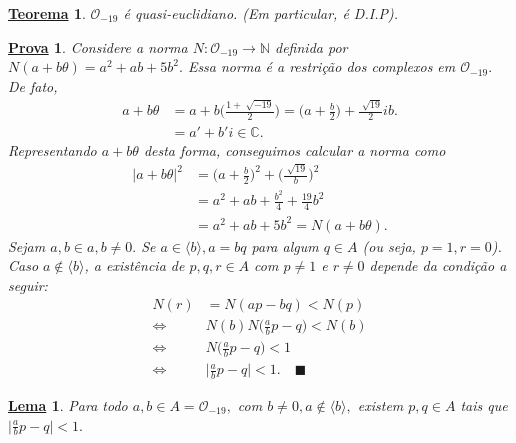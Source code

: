 \documentclass{article}
\newtheorem*{theorem*}{\underline{Teorema}}
\newtheorem*{lemma*}{\underline{Lema}}
\newtheorem*{proof*}{\underline{Prova}}
\renewcommand\qedsymbol{$\blacksquare$}
\begin{document}
\begin{theorem*}
  \(\mathcal{O}_{-19}\) é quasi-euclidiano. (Em particular, é D.I.P).
\end{theorem*}
\begin{proof*}
  Considere a norma \(N:\mathcal{O}_{-19}\rightarrow \mathbb{N}\) definida por \(N(a+b\theta ) = a^{2} + ab + 5b^{2}.\) Essa norma é a
  restrição dos complexos em \(\mathcal{O}_{-19}.\) De fato,
  \begin{align*}
    a + b\theta &= a +b \biggl(\frac{1+\sqrt[]{-19}}{2}\biggr) = \biggl(a + \frac{b}{2}\biggr) + \frac{\sqrt[]{19}}{2}ib.\\
                &= a' + b'i\in \mathbb{C}.
  \end{align*}
  Representando \(a + b\theta \) desta forma, conseguimos calcular a norma como 
  \begin{align*}
    |a+b\theta |^{2} &= \biggl(a + \frac{b}{2}\biggr)^{2} + \biggl(\frac{\sqrt[]{19}}{b}\biggr)^{2}\\
                     &= a^{2} + ab + \frac{b^{2}}{4} + \frac{19}{4}b^{2}\\
                     &= a^{2} + ab + 5b^{2} = N(a + b\theta ).
  \end{align*}
  Sejam \(a, b\in a, b\neq0.\) Se \(a\in \langle b \rangle, a = bq\) para algum \(q\in A\) (ou seja, \(p=1, r = 0\)).
  Caso \(a\not\in \langle b \rangle\), a existência de \(p, q, r\in A\) com \(p\neq 1\) e \(r\neq 0\) depende da condição 
  a seguir:
  \begin{align*}
    N(r) &= N(ap-bq) < N(p)\\
    \Longleftrightarrow & N(b)N \biggl(\frac{a}{b}p - q\biggr) < N(b)\\
    \Longleftrightarrow & N \biggl(\frac{a}{b}p - q\biggr) < 1\\
    \Longleftrightarrow & \biggl|\frac{a}{b}p - q\biggr| < 1. \quad\text{\qedsymbol}
  \end{align*} 
\end{proof*}
\begin{lemma*}
  Para todo \(a, b\in A = \mathcal{O}_{-19},\) com \(b\neq0, a\not\in \langle b \rangle,\) existem \(p, q\in A\) tais que 
  \(\biggl|\frac{a}{b}p - q\biggr| < 1.\)
\end{lemma*}
\end{document}

